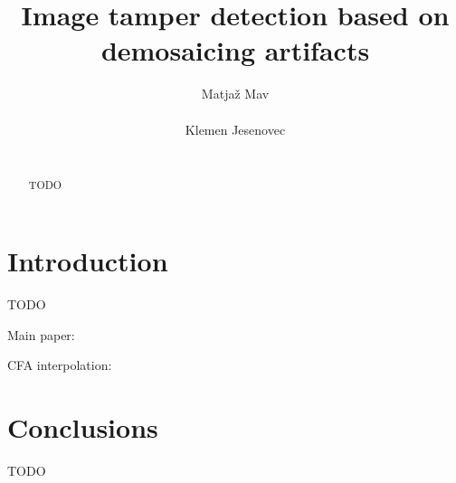 \documentclass{template/acm_proc_article-sp}
\begin{document}
 

\title{Image tamper detection based on demosaicing artifacts}

\author{
\alignauthor
Matjaž Mav\\
       \\
\alignauthor
Klemen Jesenovec\\
       \\
}

\maketitle
\begin{abstract}
TODO
\end{abstract}


\section{Introduction}
TODO

Main paper: \cite{dirik2009image}

CFA interpolation: \cite{cfainterpolation2009}

\section{Conclusions}
TODO



\end{document}
